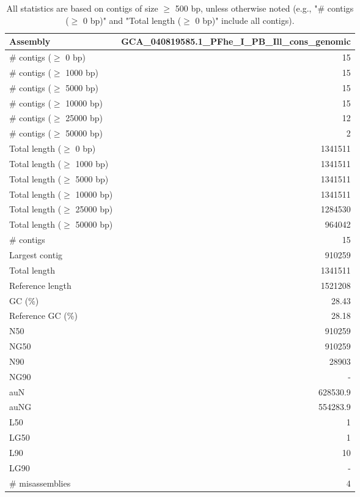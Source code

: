 \documentclass[12pt,a4paper]{article}
\begin{document}
\begin{table}[ht]
\begin{center}
\caption{All statistics are based on contigs of size $\geq$ 500 bp, unless otherwise noted (e.g., "\# contigs ($\geq$ 0 bp)" and "Total length ($\geq$ 0 bp)" include all contigs).}
\begin{tabular}{|l*{1}{|r}|}
\hline
Assembly & GCA\_040819585.1\_PFhe\_I\_PB\_Ill\_cons\_genomic \\ \hline
\# contigs ($\geq$ 0 bp) & 15 \\ \hline
\# contigs ($\geq$ 1000 bp) & 15 \\ \hline
\# contigs ($\geq$ 5000 bp) & 15 \\ \hline
\# contigs ($\geq$ 10000 bp) & 15 \\ \hline
\# contigs ($\geq$ 25000 bp) & 12 \\ \hline
\# contigs ($\geq$ 50000 bp) & 2 \\ \hline
Total length ($\geq$ 0 bp) & 1341511 \\ \hline
Total length ($\geq$ 1000 bp) & 1341511 \\ \hline
Total length ($\geq$ 5000 bp) & 1341511 \\ \hline
Total length ($\geq$ 10000 bp) & 1341511 \\ \hline
Total length ($\geq$ 25000 bp) & 1284530 \\ \hline
Total length ($\geq$ 50000 bp) & 964042 \\ \hline
\# contigs & 15 \\ \hline
Largest contig & 910259 \\ \hline
Total length & 1341511 \\ \hline
Reference length & 1521208 \\ \hline
GC (\%) & 28.43 \\ \hline
Reference GC (\%) & 28.18 \\ \hline
N50 & 910259 \\ \hline
NG50 & 910259 \\ \hline
N90 & 28903 \\ \hline
NG90 & - \\ \hline
auN & 628530.9 \\ \hline
auNG & 554283.9 \\ \hline
L50 & 1 \\ \hline
LG50 & 1 \\ \hline
L90 & 10 \\ \hline
LG90 & - \\ \hline
\# misassemblies & 4 \\ \hline

\end{tabular}
\end{center}
\end{table}
\end{document}
